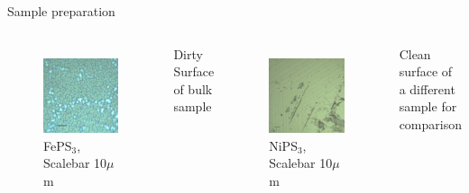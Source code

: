 \documentclass[
	10pt,
]{beamer}
\begin{document}
\begin{frame}{Sample preparation}
\begin{columns}
		\begin{figure}
			\centering
			\includegraphics[width=\textwidth]{../../data/2023-11-02/i009_FePS3_100x-scalebar.png}
			FePS$_3$, Scalebar 10$\mu$m
		\end{figure}
		Dirty Surface of bulk sample

		\begin{figure}
			\centering
			\includegraphics[width=\textwidth]{../../data/2023-11-02/i005_NiPS3_50x-scalebar.png}
			NiPS$_3$, Scalebar 10$\mu$m
		\end{figure}
		Clean surface of a different sample for comparison


\end{columns}
\end{frame}
\end{document}
